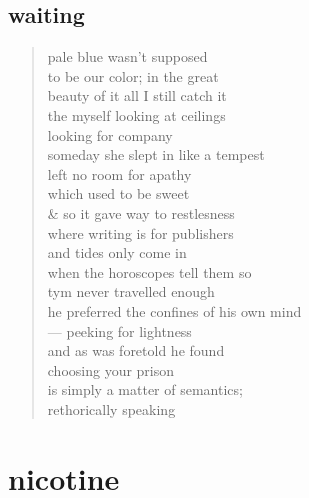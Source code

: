 \documentclass[11pt]{article}
\begin{document}
\subsection{waiting}
\label{sec:orgcf31d35}
\begin{verse}
pale blue wasn't supposed\\
to be our color; in the great\\
beauty of it all I still catch it\\
the myself looking at ceilings\\
looking for company\\
\vspace*{1em}
someday she slept  in like a tempest\\
left no room for apathy\\
which used to be sweet\\
\& so it gave way to restlesness\\
where writing is for publishers\\
and tides only come in\\
when the horoscopes tell them so\\
\vspace*{1em}
tym never travelled enough\\
he preferred the confines of his own mind\\
--- peeking for lightness\\
and as was foretold he found\\
choosing your prison\\
is simply a matter of semantics;\\
rethorically speaking\\
\end{verse}
\section{nicotine}
\label{sec:org0c3b0a6}
\end{document}
